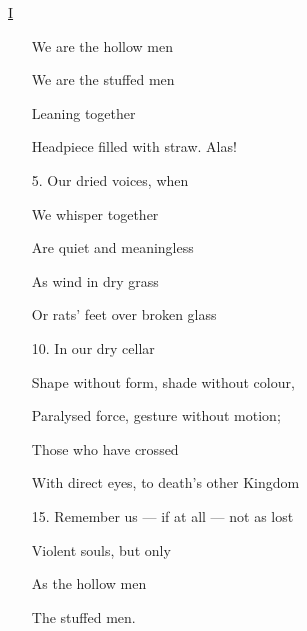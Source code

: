 \documentclass[10pt]{article}
\begin{document}
\begin{multicols}{2}

        \begin{minipage}[t][0.5\textheight]{0.45\textwidth}
        \begin{center} \underline{I} \end{center}
        \begin{enumerate}[itemsep=0.1ex]
            \item[] We are the hollow men
            \item[] We are the stuffed men
            \item[] Leaning together
            \item[] Headpiece filled with straw. Alas!
            \item[5.] Our dried voices, when
            \item[] We whisper together
            \item[] Are quiet and meaningless
            \item[] As wind in dry grass
            \item[] Or rats' feet over broken glass
            \item[10.] In our dry cellar
            \item[]
            \item[] Shape without form, shade without colour,
            \item[] Paralysed force, gesture without motion;
            \item[]
            \item[] Those who have crossed
            \item[] With direct eyes, to death's other Kingdom
            \item[15.] Remember us --- if at all --- not as lost
            \item[] Violent souls, but only
            \item[] As the hollow men
            \item[] The stuffed men.
        \end{enumerate}
    \end{minipage}


\end{multicols}
\end{document}

